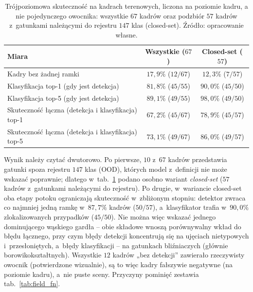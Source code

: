 \begin{table}[htbp]
 \centering
 \small
 \caption{Trójpoziomowa skuteczność na kadrach terenowych, liczona na poziomie kadru, a nie pojedynczego owocnika: wszystkie $67$ kadrów oraz podzbiór $57$ kadrów z~gatunkami należącymi do rejestru $147$ klas (closed-set). Źródło: opracowanie własne.}
 \label{tab:field_accuracy}
 \begin{tabular}{|p{6.0cm}|c|c|}
 \hline
 \textbf{Miara} & \textbf{Wszystkie ($67$)} & \textbf{Closed-set ($57$)} \\
 \hline \hline
 Kadry bez żadnej ramki & $17{,}9\%$ ($12/67$) & $12{,}3\%$ ($7/57$) \\
 \hline
 Klasyfikacja top-1 (gdy jest detekcja) & $81{,}8\%$ ($45/55$) & $90{,}0\%$ ($45/50$) \\
 \hline
 Klasyfikacja top-5 (gdy jest detekcja) & $89{,}1\%$ ($49/55$) & $98{,}0\%$ ($49/50$) \\
 \hline
 Skuteczność łączna (detekcja i klasyfikacja) top-1 & $67{,}2\%$ ($45/67$) & $78{,}9\%$ ($45/57$) \\
 \hline
 Skuteczność łączna (detekcja i klasyfikacja) top-5 & $73{,}1\%$ ($49/67$) & $86{,}0\%$ ($49/57$) \\
 \hline
 \end{tabular}
\end{table}

Wynik należy czytać dwutorowo. Po pierwsze, $10$ z~$67$ kadrów przedstawia gatunki spoza rejestru $147$ klas (OOD), których model z~definicji nie może wskazać poprawnie; dlatego w~tab.~\ref{tab:field_accuracy} podano osobno wariant \emph{closed-set} ($57$ kadrów z~gatunkami należącymi do rejestru). Po drugie, w~wariancie closed-set oba etapy potoku ograniczają skuteczność w~zbliżonym stopniu: detektor zwraca co najmniej jedną ramkę w~$87{,}7\%$ kadrów ($50/57$), a~klasyfikator trafia w~$90{,}0\%$ zlokalizowanych przypadków ($45/50$). Nie można więc wskazać jednego dominującego wąskiego gardła -- obie składowe wnoszą porównywalny wkład do błędu łącznego, przy czym błędy detekcji koncentrują się na ujęciach nietypowych i~przesłoniętych, a~błędy klasyfikacji -- na gatunkach bliźniaczych (głównie borowikokształtnych). Wszystkie $12$ kadrów „bez detekcji” zawierało rzeczywisty owocnik (potwierdzone wizualnie), są to więc kadry fałszywie negatywne (na poziomie kadru), a~nie puste sceny. Przyczyny pominięć zestawia tab.~\ref{tab:field_fn}.

